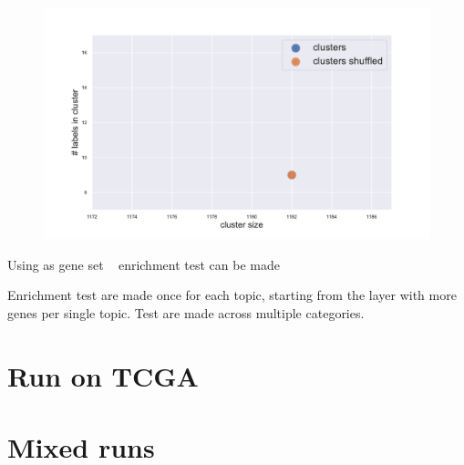 \begin{figure}[htb!]
\begin{minipage}{0.45\textwidth}
    \end{minipage}
    \hspace{3mm}
    \begin{minipage}{0.45\textwidth}
    \includegraphics[width=0.9\linewidth]{pictures/topic/gtex/oversigma_10tissue/shuffledcluster_shuffle_label_size_l4_primary_site.pdf}
    \end{minipage}
\end{figure}



Using as gene set ~\cite{Ardlie2015} enrichment test can be made \cite{Kuleshov2016}

Enrichment test are made once for each topic, starting from the layer with more genes per 
single topic. Test are made across multiple categories.

\section{Run on TCGA}

\section{Mixed runs}

